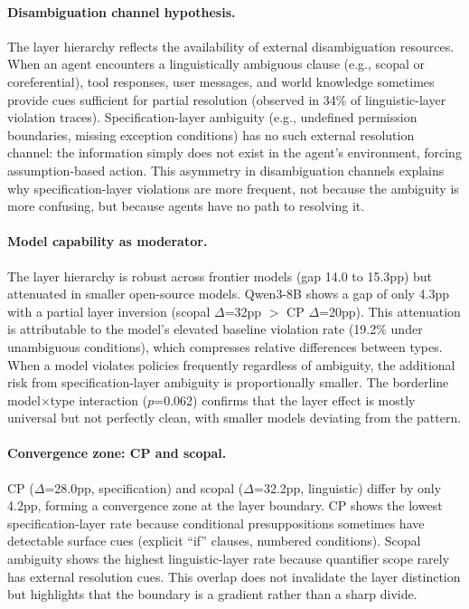 \documentclass[11pt]{article}
\begin{document}
\paragraph{Disambiguation channel hypothesis.}
The layer hierarchy reflects the availability of external disambiguation resources. When an agent encounters a linguistically ambiguous clause (e.g., scopal or coreferential), tool responses, user messages, and world knowledge sometimes provide cues sufficient for partial resolution (observed in 34\% of linguistic-layer violation traces). Specification-layer ambiguity (e.g., undefined permission boundaries, missing exception conditions) has no such external resolution channel: the information simply does not exist in the agent's environment, forcing assumption-based action. This asymmetry in disambiguation channels explains why specification-layer violations are more frequent, not because the ambiguity is more confusing, but because agents have no path to resolving it.

\paragraph{Model capability as moderator.}
The layer hierarchy is robust across frontier models (gap 14.0 to 15.3pp) but attenuated in smaller open-source models. Qwen3-8B shows a gap of only 4.3pp with a partial layer inversion (scopal $\Delta$=32pp $>$ CP $\Delta$=20pp). This attenuation is attributable to the model's elevated baseline violation rate (19.2\% under unambiguous conditions), which compresses relative differences between types. When a model violates policies frequently regardless of ambiguity, the additional risk from specification-layer ambiguity is proportionally smaller. The borderline model$\times$type interaction ($p$=0.062) confirms that the layer effect is mostly universal but not perfectly clean, with smaller models deviating from the pattern.

\paragraph{Convergence zone: CP and scopal.}
CP ($\Delta$=28.0pp, specification) and scopal ($\Delta$=32.2pp, linguistic) differ by only 4.2pp, forming a convergence zone at the layer boundary. CP shows the lowest specification-layer rate because conditional presuppositions sometimes have detectable surface cues (explicit ``if'' clauses, numbered conditions). Scopal ambiguity shows the highest linguistic-layer rate because quantifier scope rarely has external resolution cues. This overlap does not invalidate the layer distinction but highlights that the boundary is a gradient rather than a sharp divide.
\end{document}

